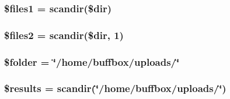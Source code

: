\subsubsection[{\$files1}]{\setlength{\rightskip}{0pt plus 5cm}\$files1 = scandir(\$dir)}\label{secret_8php_ab747bc60f1f1e91f2e63c33ecf45383b}
\hypertarget{secret_8php_a03df2b578a62dd604a097c85c7f7617d}{}
\subsubsection[{\$files2}]{\setlength{\rightskip}{0pt plus 5cm}\$files2 = scandir(\$dir, 1)}\label{secret_8php_a03df2b578a62dd604a097c85c7f7617d}
\hypertarget{secret_8php_a5ade1bb16ee3a241cefc0b84918f1598}{}
\subsubsection[{\$folder}]{\setlength{\rightskip}{0pt plus 5cm}\$folder = \char`\"{}/home/buffbox/uploads/\char`\"{}}\label{secret_8php_a5ade1bb16ee3a241cefc0b84918f1598}
\hypertarget{secret_8php_a233d12bd8b6d3453e9a7a3f0b8c31db2}{}
\subsubsection[{\$results}]{\setlength{\rightskip}{0pt plus 5cm}\$results = scandir(\char`\"{}/home/buffbox/uploads/\char`\"{})}\label{secret_8php_a233d12bd8b6d3453e9a7a3f0b8c31db2}
